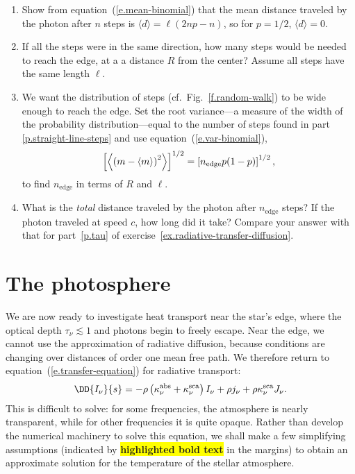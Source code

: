 \begin{exercisebox}
\label{ex.random-walk-diffusion}
\begin{enumerate}
\item
Show from equation~(\ref{e.mean-binomial}) that the mean distance traveled by the photon after $n$ steps is $\langle d\rangle = \ell(2np-n)$, so for $p=1/2$, $\langle d\rangle = 0$.

\item\label{p.straight-line-steps}
If all the steps were in the same direction, how many steps would be needed to reach the edge, at a a distance $R$ from the center? Assume all steps have the same length $\ell$.

\item
We want the distribution of steps (cf.\ Fig.~\ref{f.random-walk}) to be wide enough to reach the edge. Set the root variance---a measure of the width of the probability distribution---equal to the number of steps found in part \ref{p.straight-line-steps} and use equation~(\ref{e.var-binomial}),
	\[
		\left[\left\langle\left(m-\left\langle m\right\rangle\right)^{2}\right\rangle\right]^{1/2} = 
			\left[n_{\mathrm{edge}}p(1-p)\right]^{1/2},
	\]
	to find $n_{\mathrm{edge}}$ in terms of $R$ and $\ell$.

\item
What is the \emph{total} distance traveled by the photon after $n_{\mathrm{edge}}$ steps? If the photon traveled at speed $c$, how long did it take? Compare your answer with that for part~\ref{p.tau} of exercise~\ref{ex.radiative-transfer-diffusion}.

\end{enumerate}
\end{exercisebox}

\section{The photosphere}

We are now ready to investigate heat transport near the star's edge, where the optical depth $\tau_{\nu} \lesssim 1$ and photons begin to freely escape. Near the edge, we cannot use the approximation of radiative diffusion, because conditions are changing over distances of order one mean free path. We therefore return to equation~(\ref{e.transfer-equation}) for radiative transport:
\[
	\DD{I_{\nu}}{s} = -\rho\left(\kapabs + \kapscat\right) I_{\nu} + \rho j_{\nu} + \rho\kapscat J_{\nu}.
\]
This is difficult to solve: for some frequencies, the atmosphere is nearly transparent, while for other frequencies it is quite opaque. Rather than develop the numerical machinery to solve this equation, we shall make a few simplifying assumptions (indicated by \colorbox{yellow}{\textbf{highlighted bold text}} in the margins) to obtain an approximate solution for the temperature of the stellar atmosphere.


